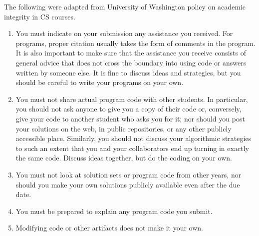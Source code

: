 The following were adapted from University of Washington policy on academic integrity in CS courses.
\begin{enumerate} 
\item
You must indicate on your submission any assistance you received. For programs, proper citation usually takes the form of comments in the program. It is also important to make sure that the assistance you receive consists of general advice that does not cross the boundary into using code or answers written by someone else. It is fine to discuss ideas and strategies, but you should be careful to write your programs on your own. 
\item
You must not share actual program code with other students. In particular, you should not ask anyone to give you a copy of their code or, conversely, give your code to another student who asks you for it; nor should you post your solutions on the web, in public repositories, or any other publicly accessible place. Similarly, you should not discuss your algorithmic strategies to such an extent that you and your collaborators end up turning in exactly the same code. Discuss ideas together, but do the coding on your own.

\item You must not look at solution sets or program code from other years, nor should you make your own solutions publicly available even after the due date. 

\item You must be prepared to explain any program code you submit.
\item Modifying code or other artifacts does not make it your own.
\end{enumerate}